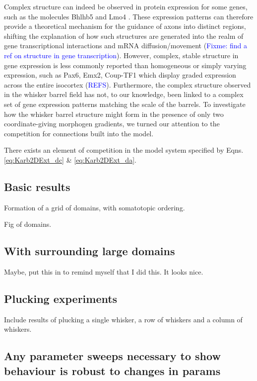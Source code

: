 \documentclass[a4paper,11pt]{article}
\newcommand{\cmnt}[1]{\textcolor{blue}{#1}}
\begin{document}
Complex structure can indeed be observed in protein expression for some genes,
such as the molecules Bhlhb5 \citep{Joshi2008} and Lmo4
\citep{Cederquist2013,Greig2013}. These expression patterns can therefore
provide a theoretical mechanism for the guidance of axons into distinct
regions, shifting the explanation of how such structures are generated into
the realm of gene transcriptional interactions and mRNA diffusion/movement
(\cmnt{Fixme: find a ref on structure in gene transcription}). However,
complex, stable structure in gene expression is less commonly reported than
homogeneous or simply varying expression, such as Pax6, Emx2, Coup-TF1 which
display graded expression across the entire isocortex
(\cmnt{REFS}). Furthermore, the complex structure observed in the whisker
barrel field has not, to our knowledge, been linked to a complex set of gene
expression patterns matching the scale of the barrels. To investigate how the
whisker barrel structure might form in the presence of only two
coordinate-giving morphogen gradients, we turned our attention to the
competition for connections built into the model.

There exists an element of competition in the model system specified by
Eqns. \ref{eq:Karb2DExt_dc} \& \ref{eq:Karb2DExt_da}.

\subsection*{Basic results}

Formation of a grid of domains, with somatotopic ordering.

Fig of domains.

\subsection*{With surrounding large domains}

Maybe, put this in to remind myself that I did this. It looks nice.

\subsection*{Plucking experiments}

Include results of plucking a single whisker, a row of whiskers and a
column of whiskers.

\subsection*{Any parameter sweeps necessary to show behaviour is
  robust to changes in params}
\end{document}

